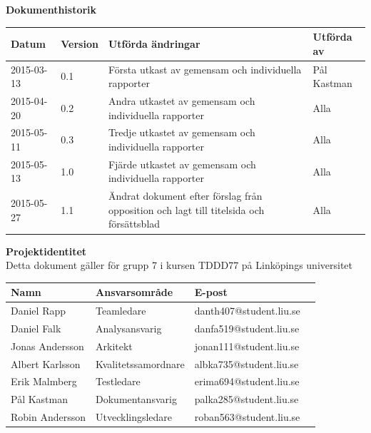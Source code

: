 \documentclass{article}
\begin{document}




\newpage
\begin{flushleft}
  {\Large \textbf{Dokumenthistorik}}\\[0.5ex]
  \begin{center}
  \vspace{3mm}
    \begin{tabular}{ | l | l | p{5cm} | l |}
    \hline
    \textbf{Datum} & \textbf{Version} & \textbf{Utförda ändringar} & \textbf{Utförda av} \\ \hline
    2015-03-13 & 0.1 & Första utkast av gemensam och individuella rapporter & Pål Kastman \\ \hline
    2015-04-20 & 0.2 & Andra utkastet av gemensam och individuella rapporter & Alla \\ \hline
    2015-05-11 & 0.3 & Tredje utkastet av gemensam och individuella rapporter & Alla \\ \hline
	2015-05-13 & 1.0 & Fjärde utkastet av gemensam och individuella rapporter & Alla \\ \hline    
	2015-05-27 & 1.1 & Ändrat dokument efter förslag från opposition och lagt till titelsida och försättsblad & Alla \\ \hline    

    \end{tabular}
  \end{center}
\end{flushleft}

\hfill

\begin{flushleft}
  {\Large \textbf{Projektidentitet}}\\[0.5ex]
  {\small} Detta dokument gäller för grupp 7  i kursen TDDD77 på Linköpings universitet
  \begin{center}
    \begin{tabular}{ | l | l | p{5cm} | l |}
    \hline
    \textbf{Namn} & \textbf{Ansvarsområde} & \textbf{E-post} \\ \hline
    Daniel Rapp & Teamledare & danth407@student.liu.se \\ \hline
    Daniel Falk & Analysansvarig & danfa519@student.liu.se \\ \hline
    Jonas Andersson & Arkitekt & jonan111@student.liu.se \\ \hline
    Albert Karlsson & Kvalitetssamordnare & albka735@student.liu.se \\ \hline
    Erik Malmberg & Testledare & erima694@student.liu.se \\ \hline
    Pål Kastman & Dokumentansvarig & palka285@student.liu.se \\ \hline
    Robin Andersson & Utvecklingsledare & roban563@student.liu.se \\ \hline

    \end{tabular}
\end{center}
\end{flushleft}
\end{document}
